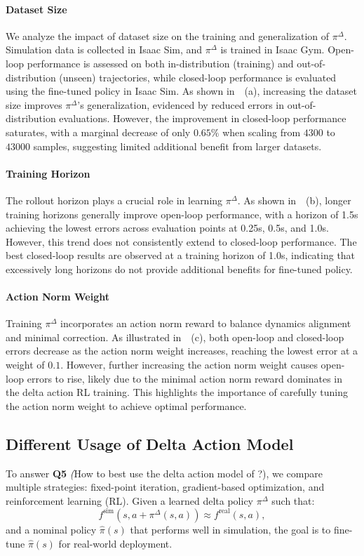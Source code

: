 \paragraph{Dataset Size} We analyze the impact of dataset size on the training and generalization of $\pi^\Delta$. Simulation data is collected in Isaac Sim, and $\pi^\Delta$ is trained in Isaac Gym. Open-loop performance is assessed on both in-distribution (training) and out-of-distribution (unseen) trajectories, while closed-loop performance is evaluated using the fine-tuned policy in Isaac Sim. As shown in~~(a), increasing the dataset size improves $\pi^\Delta$’s generalization, evidenced by reduced errors in out-of-distribution evaluations. However, the improvement in closed-loop performance saturates, with a marginal decrease of only $0.65\%$ when scaling from $4300$ to $43000$ samples, suggesting limited additional benefit from larger datasets.

\paragraph{Training Horizon} The rollout horizon plays a crucial role in learning $\pi^\Delta$. As shown in~~(b), longer training horizons generally improve open-loop performance, with a horizon of 1.5s achieving the lowest errors across evaluation points at 0.25s, 0.5s, and 1.0s. However, this trend does not consistently extend to closed-loop performance. The best closed-loop results are observed at a training horizon of 1.0s, indicating that excessively long horizons do not provide additional benefits for fine-tuned policy.

\paragraph{Action Norm Weight} Training $\pi^\Delta$ incorporates an action norm reward to balance dynamics alignment and minimal correction. As illustrated in~~(c), both open-loop and closed-loop errors decrease as the action norm weight increases, reaching the lowest error at a weight of $0.1$. However, further increasing the action norm weight causes open-loop errors to rise, likely due to the minimal action norm reward dominates in the delta action RL training. This highlights the importance of carefully tuning the action norm weight to achieve optimal performance.



\subsection{Different Usage of Delta Action Model}
To answer \textbf{Q5} \textit(How to best use the delta action model of \method?), we compare multiple strategies: fixed-point iteration, gradient-based optimization, and reinforcement learning (RL). Given a learned delta policy \(\pi^\Delta\) such that:
\[
f^\text{sim}(s, a + \pi^\Delta(s, a)) \approx f^\text{real}(s, a),
\]
and a nominal policy \(\hat{\pi}(s)\) that performs well in simulation, the goal is to fine-tune \(\hat{\pi}(s)\) for real-world deployment.


